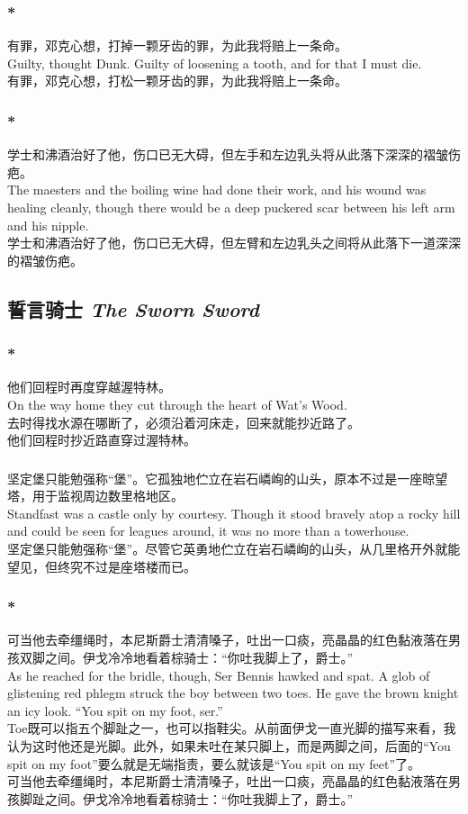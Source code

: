 \documentclass[12pt,a4paper]{article}
\newcommand{\h}[1]{{\color{red}#1}\\}
\newcommand{\la}[1]{{\color{blue}#1}\\}
\begin{document}
\subsubsection{\color{red}*}\la{
	有罪，邓克心想，打掉一颗牙齿的罪，为此我将赔上一条命。\\
	Guilty, thought Dunk. Guilty of loosening a tooth, and for that I must die.}
	有罪，邓克心想，打松一颗牙齿的罪，为此我将赔上一条命。
	
\subsubsection{\color{red}*}\la{
	学士和沸酒治好了他，伤口已无大碍，但左手和左边乳头将从此落下深深的褶皱伤疤。\\
	The maesters and the boiling wine had done their work, and his wound was healing cleanly, though there would be a deep puckered scar between his left arm and his nipple.}
	学士和沸酒治好了他，伤口已无大碍，但左臂和左边乳头之间将从此落下一道深深的褶皱伤疤。
	
\subsection{誓言骑士 \emph{The Sworn Sword}}	
\subsubsection{\color{red}*}\la{
	他们回程时再度穿越渥特林。\\
	On the way home they cut through the heart of Wat's Wood.}\h{
	去时得找水源在哪断了，必须沿着河床走，回来就能抄近路了。}
	他们回程时抄近路直穿过渥特林。
	
\subsubsection{}\la{
	坚定堡只能勉强称“堡”。它孤独地伫立在岩石嶙峋的山头，原本不过是一座晾望塔，用于监视周边数里格地区。\\
	Standfast was a castle only by courtesy. Though it stood bravely atop a rocky hill and could be seen for leagues around, it was no more than a towerhouse.}
	坚定堡只能勉强称“堡”。尽管它英勇地伫立在岩石嶙峋的山头，从几里格开外就能望见，但终究不过是座塔楼而已。
	
\subsubsection{\color{red}*}\la{
	可当他去牵缰绳时，本尼斯爵士清清嗓子，吐出一口痰，亮晶晶的红色黏液落在男孩双脚之间。伊戈冷冷地看着棕骑士：“你吐我脚上了，爵士。”\\
	As he reached for the bridle, though, Ser Bennis hawked and spat. A glob of glistening red phlegm struck the boy between two toes. He gave the brown knight an icy look. “You spit on my foot, ser.”}\h{
	Toe既可以指五个脚趾之一，也可以指鞋尖。从前面伊戈一直光脚的描写来看，我认为这时他还是光脚。此外，如果未吐在某只脚上，而是两脚之间，后面的“You spit on my foot”要么就是无端指责，要么就该是“You spit on my feet”了。}
	可当他去牵缰绳时，本尼斯爵士清清嗓子，吐出一口痰，亮晶晶的红色黏液落在男孩脚趾之间。伊戈冷冷地看着棕骑士：“你吐我脚上了，爵士。”
	
\end{document}
